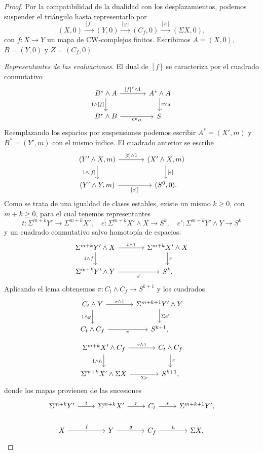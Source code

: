 \begin{proof}
Por la compatibilidad de la dualidad con los desplazamientos, podemos suspender el triángulo hasta representarlo por
\[
(X,0)\xrightarrow{[f]}(Y,0)\xrightarrow{[g]}(C_f,0)\xrightarrow{[h]}(\Sigma X,0),
\]
con $f\colon X\to Y$ un mapa de CW-complejos finitos. Escribimos $A=(X,0)$, $B=(Y,0)$ y $Z=(C_f,0)$.

\emph{Representantes de las evaluaciones.} El dual de $[f]$ se caracteriza por el cuadrado conmutativo
\[
\begin{tikzcd}[column sep=large]
B^*\wedge A \arrow[r,"{[f]^*\wedge1}"] \arrow[d,"{1\wedge[f]}"'] & A^*\wedge A \arrow[d,"\mathrm{ev}_A"]\\
B^*\wedge B \arrow[r,"\mathrm{ev}_B"'] & S.
\end{tikzcd}
\]
Reemplazando los espacios por suspensiones podemos escribir $A^*=(X',m)$ y $B^*=(Y',m)$ con el mismo índice. El cuadrado anterior se escribe
\[
\begin{tikzcd}[column sep=large]
(Y'\wedge X,m) \arrow[r,"{[t]\wedge1}"] \arrow[d,"{1\wedge[f]}"'] & (X'\wedge X,m) \arrow[d,"{[e]}"]\\
(Y'\wedge Y,m) \arrow[r,"{[e']}"'] & (S^0,0).
\end{tikzcd}
\]
Como se trata de una igualdad de clases estables, existe un mismo $k\ge0$, con $m+k\ge0$, para el cual tenemos representantes
\[
t\colon\Sigma^{m+k}Y'\to\Sigma^{m+k}X',\quad
 e\colon\Sigma^{m+k}X'\wedge X\to S^k,\quad
 e'\colon\Sigma^{m+k}Y'\wedge Y\to S^k
\]
y un cuadrado conmutativo salvo homotopía de espacios:
\[
\begin{tikzcd}[column sep=large]
\Sigma^{m+k}Y'\wedge X \arrow[r,"t\wedge1"] \arrow[d,"1\wedge f"'] & \Sigma^{m+k}X'\wedge X \arrow[d,"e"]\\
\Sigma^{m+k}Y'\wedge Y \arrow[r,"e'"'] & S^k.
\end{tikzcd}
\]
Aplicando el lema obtenemos $\pi\colon C_t\wedge C_f\to S^{k+1}$ y los cuadrados
\[
\begin{tikzcd}[column sep=large]
C_t\wedge Y \arrow[r,"s\wedge1"] \arrow[d,"1\wedge g"'] & \Sigma^{m+k+1}Y'\wedge Y \arrow[d,"\Sigma e'"]\\
C_t\wedge C_f \arrow[r,"\pi"'] & S^{k+1},
\end{tikzcd}
\]
\[
\begin{tikzcd}[column sep=large]
\Sigma^{m+k}X'\wedge C_f \arrow[r,"r\wedge1"] \arrow[d,"1\wedge h"'] & C_t\wedge C_f \arrow[d,"\pi"]\\
\Sigma^{m+k}X'\wedge\Sigma X \arrow[r,"\Sigma e"'] & S^{k+1},
\end{tikzcd}
\]
donde los mapas provienen de las sucesiones
\[
\begin{tikzcd}
\Sigma^{m+k}Y' \arrow[r,"t"] & \Sigma^{m+k}X' \arrow[r,"r"] & C_t \arrow[r,"s"] & \Sigma^{m+k+1}Y',\\
X \arrow[r,"f"] & Y \arrow[r,"g"] & C_f \arrow[r,"h"] & \Sigma X.
\end{tikzcd}
\]


\end{proof}
